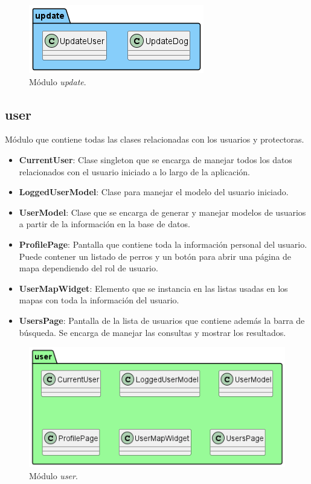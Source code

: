 \documentclass[a4paper, 12pt]{article}
\begin{document}
\begin{figure}[H]
	\begin{center}
		{\includegraphics[]{diagram/Update.png}\par}
		\caption{Módulo  \textit{update}.}
	\end{center}
\end{figure}



\subsection*{user}

Módulo que contiene todas las clases relacionadas con los usuarios y protectoras.

\begin{itemize}[noitemsep]
	\item \textbf{CurrentUser}: Clase singleton que se encarga de manejar todos los datos relacionados con el usuario iniciado a lo largo de la aplicación.
	\item \textbf{LoggedUserModel}: Clase para manejar el modelo del usuario iniciado.
	\item \textbf{UserModel}: Clase que se encarga de generar y manejar modelos de usuarios a partir de la información en la base de datos. 
	\item \textbf{ProfilePage}:  Pantalla que contiene toda la información personal del usuario. Puede contener un listado de perros y un botón para abrir una página de mapa dependiendo del rol de usuario.
	\item \textbf{UserMapWidget}: Elemento que se instancia en las listas usadas en los mapas con toda la información del usuario.
	\item \textbf{UsersPage}: Pantalla de la lista de usuarios que contiene además la barra de búsqueda. Se encarga de manejar las consultas y mostrar los resultados.
\end{itemize}

\begin{figure}[H]
	\begin{center}
		{\includegraphics[width=0.8\linewidth]{diagram/User.png}\par}
		\caption{Módulo  \textit{user}.}
	\end{center}
\end{figure}
\end{document}

